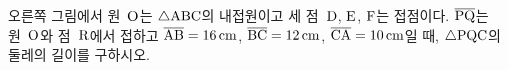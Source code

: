 \noindent\begin{minipage}[t]{0.58\linewidth}\vspace{0pt}\raggedright 오른쪽 그림에서 원~$\mathrm{O}$는 $\triangle\mathrm{ABC}$의 내접원이고 세 점~$\mathrm{D}$, $\mathrm{E}$, $\mathrm{F}$는 접점이다. $\overline{\mathrm{PQ}}$는 원~$\mathrm{O}$와 점~$\mathrm{R}$에서 접하고 $\overline{\mathrm{AB}}=16\,\mathrm{cm}$, $\overline{\mathrm{BC}}=12\,\mathrm{cm}$, $\overline{\mathrm{CA}}=10\,\mathrm{cm}$일 때, $\triangle\mathrm{PQC}$의 둘레의 길이를 구하시오.\end{minipage}\hfill\begin{minipage}[t]{0.4\linewidth}\vspace{0pt}\centering \resizebox{\ifdim\width>\linewidth\linewidth\else\width\fi}{!}{}\end{minipage}\par

